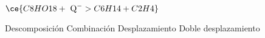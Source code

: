 $\ce{C8HO18  +  \text{ Q} ^ -> C6H14 + C2H4}$

\begin{choices}
    \CorrectChoice Descomposición
    \choice Combinación
    \choice Desplazamiento
    \choice Doble desplazamiento
\end{choices}